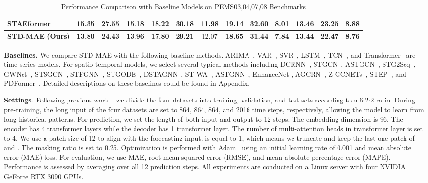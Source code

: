 \documentclass[letterpaper]{article} \usepackage{aaai24}  \usepackage{times}  \usepackage{helvet}  \usepackage{courier}  \usepackage[hyphens]{url}  \usepackage{graphicx} \urlstyle{rm} \def\UrlFont{\rm}  \usepackage{natbib}  \usepackage{caption} \frenchspacing  \setlength{\pdfpagewidth}{8.5in} \setlength{\pdfpageheight}{11in} \usepackage{algorithm}
\begin{document}
\begin{table*}[h]
{\begin{tabular}{l|c c c|c c c |c c c|c c c}
STAEformer~\cite{liu2023spatio}           & 15.35                    & 27.55             & 15.18                         & 18.22                & 30.18            & \bf{11.98}               & 19.14                &  32.60               & 8.01                & 13.46                &  23.25             & 8.88                  \\\hline
\textbf{STD-MAE (Ours)}                                    & \bf{13.80}           & \bf{24.43}     & \bf{13.96}                 & \bf{17.80}           & \bf{29.21}       & 12.07                    & \bf{18.65}           &  \bf{31.44}          & \bf{7.84} &       
\bf{13.44}           &  \bf{22.47}         & \bf{8.76}             \\
     \bottomrule[1.2pt]
     \end{tabular}
	}
	\caption{Performance Comparison with Baseline Models on PEMS03,04,07,08 Benchmarks}
	\label{tab:overall}
\end{table*}

\noindent\textbf{Baselines.} We compare STD-MAE with the following baseline methods. ARIMA~\cite{fang2021spatial}, VAR~\cite{song2020spatial}, SVR~\cite{song2020spatial}, LSTM~\cite{song2020spatial}, TCN~\cite{lan2022dstagnn}, and Transformer~\cite{vaswani2017attention} are time series models. For spatio-temporal models, we select several typical methods including DCRNN~\cite{li2018diffusion}, STGCN~\cite{yu2018spatio}, ASTGCN~\cite{guo2019attention}, STG2Seq~\cite{bai2019stg2seq}, GWNet~\cite{wu2019graph}, STSGCN~\cite{song2020spatial}, STFGNN~\cite{li2021spatial}, STGODE~\cite{fang2021spatial}, DSTAGNN~\cite{lan2022dstagnn}, ST-WA~\cite{cirstea2022towards}, ASTGNN~\cite{guo2021learning}, EnhanceNet \cite{cirstea2021enhancenet}, AGCRN~\cite{bai2020adaptive}, Z-GCNETs~\cite{chen2021z}, STEP~\cite{shao2022pre}, and PDFormer~\cite{jiang2023pdformer}. Detailed descriptions on these baselines could be found in Appendix.




\noindent\textbf{Settings.} Following previous work~\cite{song2020spatial,li2021spatial,fang2021spatial,jiang2023pdformer,guo2021learning}, we divide the four datasets into training, validation, and test sets according to a 6:2:2 ratio. During pre-training, the long input  of the four datasets are set to 864, 864, 864, and 2016 time steps, respectively, allowing the model to learn from long historical patterns. For prediction, we set the length of both input  and output  to 12 steps. The embedding dimension  is 96. The encoder has 4 transformer layers while the decoder has 1 transformer layer. The number of multi-attention heads in transformer layer is set to 4. We use a patch size  of 12 to align with the forecasting input.  is equal to 1, which means we truncate and keep the last one patch of  and . The masking ratio  is set to 0.25. Optimization is performed with Adam~\cite{kingma2014adam} using an initial learning rate of 0.001 and mean absolute error (MAE) loss. For evaluation, we use MAE, root mean squared error (RMSE), and mean absolute percentage error (MAPE). Performance is assessed by averaging over all 12 prediction steps. All experiments are conducted on a Linux server with four NVIDIA GeForce RTX 3090 GPUs.
\end{document}
